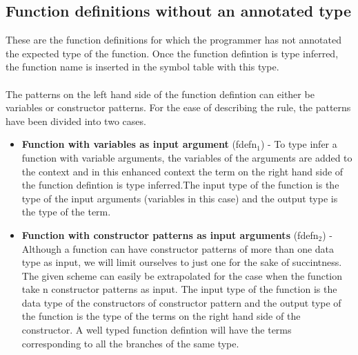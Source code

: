 \documentclass[11pt]{article}
\begin{document}
\subsection {Function definitions without an annotated type}
These are the function definitions for which the programmer has not annotated the expected type of the function. Once the function defintion is type inferred, the function name is inserted in the symbol table with this type. 
~~\\~~\\
The patterns on the left hand side of the function defintion can either be variables or constructor patterns. For the ease of describing the rule, the patterns have been divided into two cases.
\begin {itemize}
  \item {\bf Function with variables as input argument} ({\sf fdefn$_1$)} -
To type infer a function with variable arguments, the variables of the arguments are added to the context and in this enhanced context the term on the right hand side of the function defintion is type inferred.The input type of the function is the type of the input arguments (variables in this case) and the output type is the type of the term.   

  \item {\bf Function with constructor patterns as input arguments} ({\sf fdefn$_2$)} - Although a function can have constructor patterns of more than one data type as input, we will limit ourselves to just one for the sake of succintness. The given scheme can easily be extrapolated for the case when the function take n constructor patterns as input. The input type of the function is the data type of the constructors of constructor pattern and the output type of the function is the type of the terms on the right hand side of the constructor. A well typed function defintion will have the terms corresponding to all the branches of the same type. 
\end {itemize} 
\end{document}
